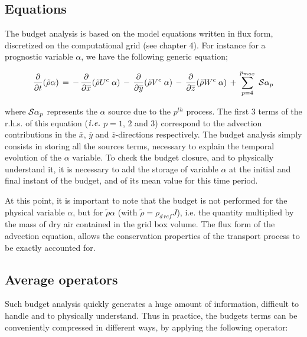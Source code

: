 \subsection{Equations}

 The budget analysis is based on the model equations written in flux form,
discretized on the computational grid (see chapter 4).
 For instance for a prognostic variable
$\alpha$, we have the following generic equation;

\begin{equation}
\dfrac{\partial}{\partial t}(\tilde{\rho}\alpha) \, = \, - \,
 \dfrac{\partial }{\partial \overline{x}} (\tilde{\rho} U^{c} \;  \alpha)
\, - \, \dfrac{\partial }{\partial \overline{y}} (\tilde{\rho} V^{c} \;  \alpha)
\, - \, \dfrac{\partial }{\partial \overline{z}} (\tilde{\rho} W^{c} \;  \alpha)
\, + \, \sum_{p=4}^{p_{max}} \; {\cal S}\alpha_p
\end{equation}

\noindent where ${\cal S}\alpha_p$ represents the $\alpha$ source
due to the $p^{th}$ process. The first 3 terms of the r.h.s. of this equation
($\it i.e.$ $p= 1$, $2$ and $3$) correspond to the advection contributions in the
$\overline{x}$, $\overline{y}$ and $\overline{z}$-directions respectively.
The budget analysis simply consists in storing all the sources terms,
necessary to explain the temporal evolution of the $\alpha$ variable.
To check the budget closure, and to physically understand it, it is necessary to
add the storage of variable $\alpha$ at the initial and final instant
of the budget, and of its mean value for this time period.

 At this point, it is important to note that the budget is not performed for the
physical variable $\alpha$, but for $\tilde{\rho}\alpha$
(with $\tilde{\rho}  = \rho_{d\,ref} J$), i.e. the quantity multiplied
by the mass of dry
air contained in the grid box volume. The flux form of the advection equation,
allows the conservation properties of the transport process to be exactly
accounted for.

\subsection{Average operators}

 Such budget analysis quickly generates a huge amount of information, difficult
to handle and to physically understand. Thus in practice, the budgets terms
can be conveniently compressed in different ways, by applying the following
operator:

